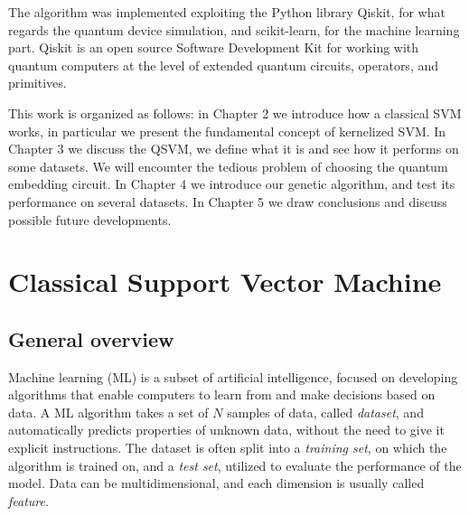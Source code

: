 \documentclass[12pt]{article}
\begin{document}
The algorithm was implemented exploiting the Python library Qiskit, for what regards the quantum device simulation, and scikit-learn, for the machine learning part. Qiskit is an open source Software Development Kit for working with quantum computers at the level of extended quantum circuits, operators, and primitives.

This work is organized as follows: in Chapter 2 we introduce how a classical SVM works, in particular we present the fundamental concept of kernelized SVM. In Chapter 3 we discuss the QSVM, we define what it is and see how it performs on some datasets. We will encounter the tedious problem of choosing the quantum embedding circuit. In Chapter 4 we introduce our genetic algorithm, and test its performance on several datasets. In Chapter 5 we draw conclusions and discuss possible future developments. 



\newpage
\section{Classical Support Vector Machine}

\subsection{General overview}

Machine learning (ML) is a subset of artificial intelligence, focused on developing algorithms that enable computers to learn from and make decisions based on data. A ML algorithm takes a set of $N$ samples of data, called \textit{dataset}, and automatically predicts properties of unknown data, without the need to give it explicit instructions. The dataset is often split into a \textit{training set}, on which the algorithm is trained on, and a \textit{test set}, utilized to evaluate the performance of the model. Data can be multidimensional, and each dimension is usually called \textit{feature}. 
\end{document}
